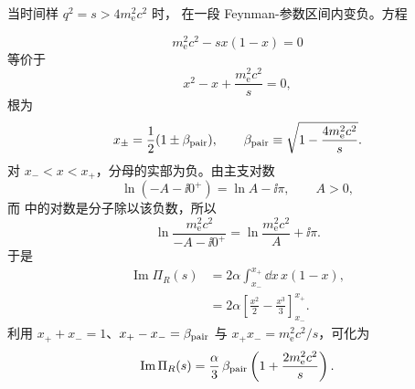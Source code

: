 \begin{derivation}[真空极化虚部与电子对阈值]
当时间样 $q^2=s>4m_{\mathrm e}^2c^2$ 时， 在一段 Feynman-参数区间内变负。方程

\begin{equation*}
 m_{\mathrm e}^2c^2-sx(1-x)=0
\end{equation*}
等价于
\begin{equation*}
 x^2-x+\frac{m_{\mathrm e}^2c^2}{s}=0,
\end{equation*}
根为
\begin{equation*}
 x_\pm=\frac12(1\pm\beta_{\rm pair}),
 \qquad
 \beta_{\rm pair}\equiv\sqrt{1-\frac{4m_{\mathrm e}^2c^2}{s}}.
\end{equation*}
对 $x_-<x<x_+$，分母的实部为负。由主支对数
\begin{equation*}
 \ln(-A-\ii0^+)=\ln A-\ii\pi,
 \qquad A>0,
\end{equation*}
而  中的对数是分子除以该负数，所以
\begin{equation*}
 \ln\frac{m_{\mathrm e}^2c^2}{-A-\ii0^+}
 =\ln\frac{m_{\mathrm e}^2c^2}{A}+\ii\pi.
\end{equation*}
于是
\begin{align*}
 \operatorname{Im}\Pi_R(s)
 &=2\alpha\int_{x_-}^{x_+}\dd x\,x(1-x),\\
 &=2\alpha\left[
 \frac{x^2}{2}-\frac{x^3}{3}
 \right]_{x_-}^{x_+}.
\end{align*}
利用 $x_++x_-=1$、$x_+-x_-=\beta_{\rm pair}$ 与 $x_+x_-=m_{\mathrm e}^2c^2/s$，可化为
\begin{equation*}
 {
 \operatorname{Im}\Pi_R(s)
 =\frac{\alpha}{3}\,
 \beta_{\rm pair}\left(1+\frac{2m_{\mathrm e}^2c^2}{s}\right).}
 \end{equation*}
\end{derivation}

